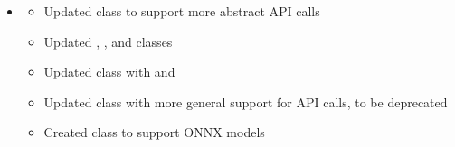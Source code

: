 \documentclass[letterpaper,10pt,english]{sphinxmanual}
\begin{document}
\begin{itemize}
\item {} \begin{description}
\begin{itemize}
\item {} 
\sphinxAtStartPar
Updated  class to support more abstract API calls

\item {} 
\sphinxAtStartPar
Updated , , and  classes

\item {} 
\sphinxAtStartPar
Updated  class with  and 

\item {} 
\sphinxAtStartPar
Updated  class with more general support for API calls,  to be deprecated

\item {} 
\sphinxAtStartPar
Created  class to support ONNX models

\end{itemize}

\end{description}

\end{itemize}
\end{document}

